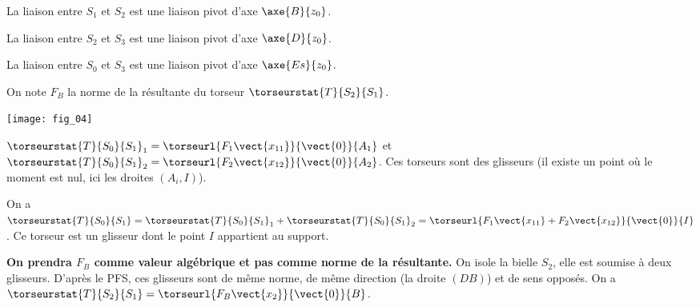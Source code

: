 La liaison entre $S_1$ et $S_2$ est une liaison pivot d’axe $\axe{B}{z_0}$.

La liaison entre $S_2$ et $S_3$ est une liaison pivot d’axe $\axe{D}{z_0}$.

La liaison entre $S_0$ et $S_3$ est une liaison pivot d’axe $\axe{Es}{z_0}$.

\ifnormal
\else
On note $F_B$ la norme de la résultante du torseur $\torseurstat{T}{S_2}{S_1}$. 
\fi

\begin{marginfigure}
\texttt{[image: fig\_04]}
\end{marginfigure}
\fi


\ifnormal
{}
\else
\fi


\ifprof
\begin{corrige}
$\torseurstat{T}{S_0}{S_1}_1=\torseurl{F_1\vect{x_{11}}}{\vect{0}}{A_1}$
et 
$\torseurstat{T}{S_0}{S_1}_2=\torseurl{F_2\vect{x_{12}}}{\vect{0}}{A_2}$. 
Ces torseurs sont des glisseurs (il existe un point où le moment est nul, ici les droites $(A_i,I)$). 
\end{corrige}
\else
\fi

\ifnormal
{}
\else
\fi

\ifprof
\begin{corrige}
On a $\torseurstat{T}{S_0}{S_1}=\torseurstat{T}{S_0}{S_1}_1+\torseurstat{T}{S_0}{S_1}_2=\torseurl{F_1\vect{x_{11}}+F_2\vect{x_{12}}}{\vect{0}}{I}$. Ce torseur est un glisseur dont le point $I$ appartient au support. 
\end{corrige}
\else
\fi

\ifnormal
{}
\else
\fi


\ifprof
\begin{corrige}
\textbf{On prendra $F_B$ comme valeur algébrique et pas comme norme de la résultante.}
On isole la bielle $S_2$, elle est soumise à deux glisseurs. D'après le PFS, ces glisseurs sont de même norme, de même direction  (la droite $(DB)$) et de sens opposés. 
On a $\torseurstat{T}{S_2}{S_1}=\torseurl{ F_B\vect{x_{2}}}{\vect{0}}{B}$.
\end{corrige}
\else
\fi


